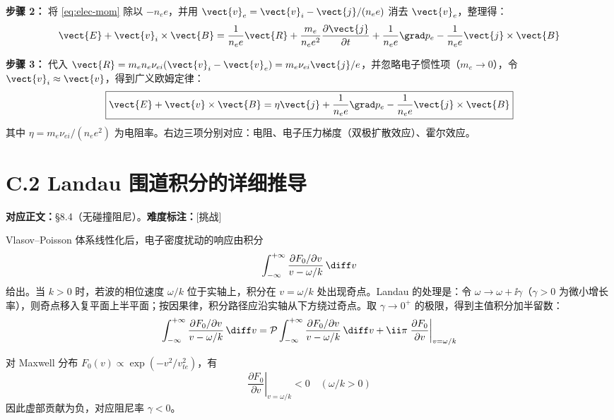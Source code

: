 \textbf{步骤 2：} 将 \eqref{eq:elec-mom} 除以 $-n_e e$，并用 $\vect{v}_e = \vect{v}_i - \vect{j}/(n_e e)$ 消去 $\vect{v}_e$，整理得：
\begin{equation}
\vect{E} + \vect{v}_i\times\vect{B} = \frac{1}{n_e e}\vect{R} + \frac{m_e}{n_e e^2}\frac{\partial \vect{j}}{\partial t} + \frac{1}{n_e e}\grad p_e - \frac{1}{n_e e}\vect{j}\times\vect{B}
\end{equation}

\textbf{步骤 3：} 代入 $\vect{R}=m_e n_e \nu_{ei}(\vect{v}_i-\vect{v}_e)=m_e \nu_{ei}\vect{j}/e$，并忽略电子惯性项（$m_e\to 0$），令 $\vect{v}_i\approx\vect{v}$，得到广义欧姆定律：
\begin{equation}
\boxed{
\vect{E} + \vect{v}\times\vect{B} = \eta\vect{j} + \frac{1}{n_e e}\grad p_e - \frac{1}{n_e e}\vect{j}\times\vect{B}
}
\end{equation}
其中 $\eta=m_e\nu_{ei}/(n_e e^2)$ 为电阻率。右边三项分别对应：电阻、电子压力梯度（双极扩散效应）、霍尔效应。


\section{C.2 Landau 围道积分的详细推导}
\label{sec:landau-contour}

\textbf{对应正文：}\S 8.4（无碰撞阻尼）。\textbf{难度标注：}[挑战]

Vlasov--Poisson 体系线性化后，电子密度扰动的响应由积分
\begin{equation}
\int_{-\infty}^{+\infty} \frac{\partial F_0/\partial v}{v-\omega/k}\,\diff v
\end{equation}
给出。当 $k>0$ 时，若波的相位速度 $\omega/k$ 位于实轴上，积分在 $v=\omega/k$ 处出现奇点。Landau 的处理是：令 $\omega\to\omega+\ii\gamma$（$\gamma>0$ 为微小增长率），则奇点移入复平面上半平面；按因果律，积分路径应沿实轴从下方绕过奇点。取 $\gamma\to 0^+$ 的极限，得到主值积分加半留数：
\begin{equation}
\int_{-\infty}^{+\infty} \frac{\partial F_0/\partial v}{v-\omega/k}\,\diff v
= \mathcal{P}\int_{-\infty}^{+\infty} \frac{\partial F_0/\partial v}{v-\omega/k}\,\diff v
+ \ii\pi\left.\frac{\partial F_0}{\partial v}\right|_{v=\omega/k}
\end{equation}

对 Maxwell 分布 $F_0(v)\propto\exp(-v^2/v_{te}^2)$，有
\begin{equation}
\left.\frac{\partial F_0}{\partial v}\right|_{v=\omega/k} < 0 \quad (\omega/k>0)
\end{equation}
因此虚部贡献为负，对应阻尼率 $\gamma<0$。

